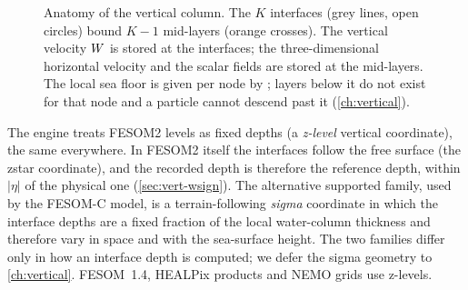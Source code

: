 \begin{figure}[t]
\centering
{}
\caption{Anatomy of the vertical column. The $K$ interfaces (grey lines, open
circles) bound $K-1$ mid-layers (orange crosses). The vertical velocity $W$ is
stored at the interfaces; the three-dimensional horizontal velocity and the scalar
fields are stored at the mid-layers. The local sea floor is given per node by
; layers below it do not exist for that node and a particle
cannot descend past it (\cref{ch:vertical}).}
\label{fig:mesh-column}
\end{figure}

The engine treats FESOM2 levels as fixed depths (a \emph{z-level} vertical coordinate), the same
everywhere. In FESOM2 itself the interfaces follow the free surface (the zstar coordinate), and the
recorded depth is therefore the reference depth, within $|\eta|$ of the physical one
(\cref{sec:vert-wsign}).
The alternative supported family, used by the FESOM-C model, is a
terrain-following \emph{sigma} coordinate in which the interface depths are a
fixed fraction of the local water-column thickness and therefore vary in space and
with the sea-surface height. The two families differ only in how an interface depth
is computed; we defer the sigma geometry to \cref{ch:vertical}. FESOM~1.4, HEALPix products and NEMO
grids use z-levels.

